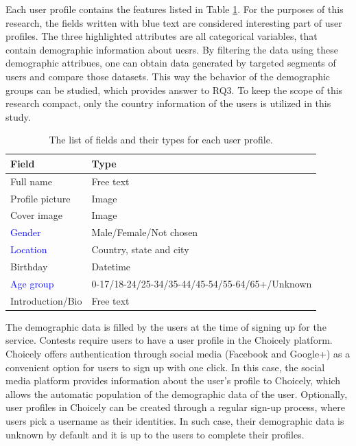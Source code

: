 Each user profile contains the features listed in Table \ref{user_profile_fields}. For the purposes of this research, the fields written with blue text are considered interesting part of user profiles. The three highlighted attributes are all categorical variables, that contain demographic information about uesrs. By filtering the data using these demographic attribues, one can obtain data generated by targeted segments of users and compare those datasets. This way the behavior of the demographic groups can be studied, which provides answer to RQ3. To keep the scope of this research compact, only the country information of the users is utilized in this study.

\begin{table}[]
    \centering
    \begin{tabular}{l|l}
        \textbf{Field}              & \textbf{Type} \\
        \hline
        Full name                   & Free text \\
        Profile picture             & Image \\ 
        Cover image                 & Image \\
        \textcolor{blue}{Gender}    & Male/Female/Not chosen \\
        \textcolor{blue}{Location}  & Country, state and city \\
        Birthday                    & Datetime \\ 
        \textcolor{blue}{Age group} & 0-17/18-24/25-34/35-44/45-54/55-64/65+/Unknown \\
        Introduction/Bio            & Free text
    \end{tabular}
    \caption{The list of fields and their types for each user profile.}
    \label{user_profile_fields}
\end{table}  

The demographic data is filled by the users at the time of signing up for the service. Contests require users to have a user profile in the Choicely platform. Choicely offers authentication through social media (Facebook and Google+) as a convenient option for users to sign up with one click. In this case, the social media platform provides information about the user's profile to Choicely, which allows the automatic population of the demographic data of the user. Optionally, user profiles in Choicely can be created through a regular sign-up process, where users pick a username as their identities. In such case, their demographic data is unknown by default and it is up to the users to complete their profiles. 

